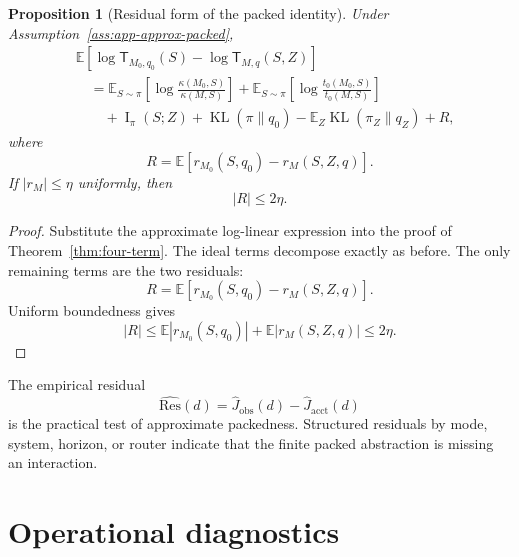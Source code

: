 \documentclass{article}
\newtheorem{proposition}{Proposition}
\DeclareMathOperator{\KL}{KL}
\DeclareMathOperator{\MI}{I}
\newcommand{\E}{\mathbb{E}}
\begin{document}
\begin{proposition}[Residual form of the packed identity]
\label{prop:app-residual-decomp}
Under Assumption~\ref{ass:app-approx-packed},
\[
\begin{aligned}
&\E[
    \log \mathsf T_{M_0,q_0}(S)
    -
    \log \mathsf T_{M,q}(S,Z)
]
\\
&\quad =
\E_{S\sim\pi}
\left[
    \log\frac{\kappa(M_0,S)}{\kappa(M,S)}
\right]
+
\E_{S\sim\pi}
\left[
    \log\frac{t_0(M_0,S)}{t_0(M,S)}
\right]
\\
&\qquad
+
\MI_\pi(S;Z)
+
\KL(\pi\|q_0)
-
\E_Z\KL(\pi_Z\|q_Z)
+
R,
\end{aligned}
\]
where
\[
    R=
    \E[r_{M_0}(S,q_0)-r_M(S,Z,q)].
\]
If \(|r_M|\le\eta\) uniformly, then
\[
    |R|\le 2\eta.
\]
\end{proposition}

\begin{proof}
Substitute the approximate log-linear expression into the proof of
Theorem~\ref{thm:four-term}.  The ideal terms decompose exactly as before.  The only
remaining terms are the two residuals:
\[
    R=
    \E[r_{M_0}(S,q_0)-r_M(S,Z,q)].
\]
Uniform boundedness gives
\[
    |R|
    \le
    \E|r_{M_0}(S,q_0)|+\E|r_M(S,Z,q)|
    \le 2\eta.
\]
\end{proof}

The empirical residual
\[
    \widehat{\mathrm{Res}}(d)
    =
    \widehat J_{\mathrm{obs}}(d)-\widehat J_{\mathrm{acct}}(d)
\]
is the practical test of approximate packedness.  Structured residuals by mode, system,
horizon, or router indicate that the finite packed abstraction is missing an interaction.


\section{Operational diagnostics}
\label{subsec:bridge}
\end{document}
